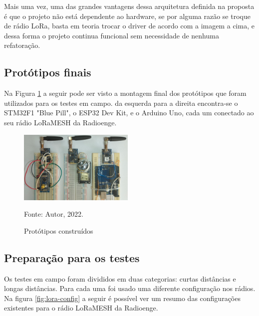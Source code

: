 Mais uma vez, uma das grandes vantagens dessa arquitetura definida na proposta é que o
projeto não está dependente ao hardware, se por alguma razão se troque de rádio
LoRa, basta em teoria trocar o driver de acordo com a imagem a cima,
e dessa forma o projeto continua funcional sem necessidade de nenhuma refatoração.

\newpage

\subsection{Protótipos finais}

Na Figura \ref{fig:prop-final} a seguir pode ser visto a montagem final dos protótipos
que foram utilizados para os testes em campo.
da esquerda para a direita encontra-se o STM32F1 "Blue Pill", o ESP32 Dev Kit,
e o Arduino Uno, cada um conectado ao seu rádio LoRaMESH da Radioenge.

\begin{figure}[H]
    \centering
	\caption{Protótipos construídos}
    \includegraphics[width=0.49\textwidth,keepaspectratio]{img/prop-final.png}
    \label{fig:prop-final}
    
    Fonte: Autor, 2022.
\end{figure}

\subsection{Preparação para os testes}

Os testes em campo foram divididos em duas categorias: curtas distâncias
e longas distâncias. Para cada uma foi usado uma diferente configuração
nos rádios. Na figura \ref{fig:lora-config} a seguir é possível ver um resumo
das configurações existentes para o rádio LoRaMESH da Radioenge.

